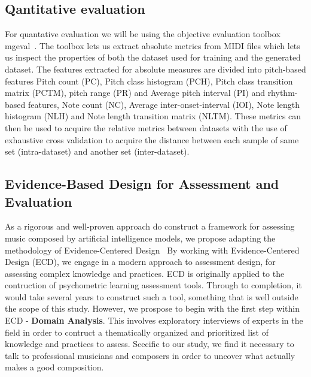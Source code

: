 \documentclass{IEEEtran}
\begin{document}

    
    \subsection{Qantitative evaluation}
        For quantative evaluation we will be using the objective
        evaluation toolbox mgeval~\cite{yang2020evaluation}.
        The toolbox lets us extract absolute metrics from MIDI files
        which lets us inspect the properties of both the dataset used
        for training and the generated dataset. The features extracted
        for absolute measures are divided into pitch-based features Pitch count (PC),
        Pitch class histogram (PCH), Pitch class transition matrix (PCTM),
        pitch range (PR) and Average pitch interval (PI) and rhythm-based features,
        Note count (NC), Average inter-onset-interval (IOI), Note length
        histogram (NLH) and Note length transition matrix (NLTM).
        These metrics can then be used to acquire the relative metrics between
        datasets with the use of exhaustive cross validation to acquire the
        distance between each sample of same set (intra-dataset) and another
        set (inter-dataset). 

    \subsection{Evidence-Based Design for Assessment and Evaluation}
        As a rigorous and well-proven approach do construct a framework for 
        assessing music composed by artificial intelligence models, we propose 
        adapting the methodology of Evidence-Centered
        Design~\cite{mislevy2003focus,mislevy2017evidence}
        By working with Evidence-Centered Design (ECD), we engage in a modern
        approach to assessment design,
        for assessing complex knowledge and practices.
        ECD is originally applied to the contruction of psychometric learning
        assessment tools. Through to completion, it would take several years to 
        construct such a tool, something that is well outside the scope of this 
        study. However, we prospose to begin with the first step within ECD - 
        \textbf{Domain Analysis}. This involves exploratory interviews of experts
        in the field in order to contruct a thematically organized and prioritized
        list of knowledge and practices to assess. Scecific to our study,
        we find it necessary to talk to professional musicians and composers 
        in order to uncover what actually makes a good composition.
\end{document}
